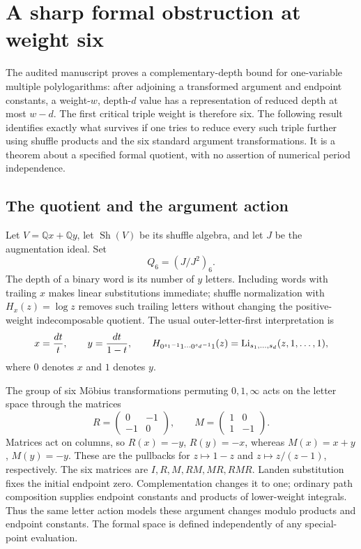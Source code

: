 \section{A sharp formal obstruction at weight six}
\label{depthnew:sec:obstruction}

The audited manuscript proves a complementary-depth bound for one-variable
multiple polylogarithms: after adjoining a transformed argument and endpoint
constants, a weight-$w$, depth-$d$ value has a representation of reduced
depth at most $w-d$. The first critical triple weight is therefore six.
The following result identifies exactly what survives if one tries to
reduce every such triple further using shuffle products and the six
standard argument transformations. It is a theorem about a specified
formal quotient, with no assertion of numerical period independence.

\subsection{The quotient and the argument action}

Let $V=\mathbb Qx+\mathbb Qy$, let $\operatorname{Sh}(V)$ be its shuffle
algebra, and let $J$ be the augmentation ideal. Set
\[
 Q_6=(J/J^2)_6.
\]
The depth of a binary word is its number of $y$ letters. Including words
with trailing $x$ makes linear substitutions immediate; shuffle
normalization with $H_x(z)=\log z$ removes such trailing letters without
changing the positive-weight indecomposable quotient.
The usual outer-letter-first interpretation is
\[
 x=\frac{dt}{t},\qquad y=\frac{dt}{1-t},\qquad
 H_{0^{s_1-1}1\cdots0^{s_d-1}1}(z)
 =\operatorname{Li}_{s_1,\ldots,s_d}(z,1,\ldots,1),
\]
where $0$ denotes $x$ and $1$ denotes $y$.

The group of six M\"obius transformations permuting $0,1,\infty$ acts
on the letter space through the matrices
\begin{equation}\label{depthnew:eq:matrices}
 R=\begin{pmatrix}0&-1\\-1&0\end{pmatrix},\qquad
 M=\begin{pmatrix}1&0\\1&-1\end{pmatrix}.
\end{equation}
Matrices act on columns, so $R(x)=-y$, $R(y)=-x$, whereas
$M(x)=x+y$, $M(y)=-y$. These are the pullbacks for $z\mapsto1-z$
and $z\mapsto z/(z-1)$, respectively. The six matrices are
$I,R,M,RM,MR,RMR$.
Landen substitution fixes the initial endpoint zero. Complementation
changes it to one; ordinary path composition supplies endpoint constants
and products of lower-weight integrals. Thus the same letter action
models these argument changes modulo products and endpoint constants.
The formal space is defined independently of any special-point evaluation.

